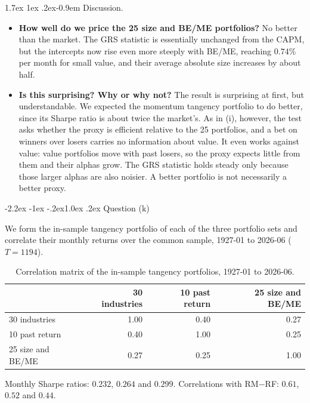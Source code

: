 \documentclass[11pt]{article}
\makeatletter
\renewcommand\subsection{\@startsection{subsection}{2}{0pt}%
  {-2.2ex \@plus -1ex \@minus -.2ex}{1.0ex \@plus .2ex}%
  {\normalfont\bfseries\normalsize\color{psink}}}
\renewcommand\paragraph{\@startsection{paragraph}{4}{0pt}%
  {1.7ex \@plus 1ex \@minus .2ex}{-0.9em}%
  {\normalfont\bfseries\normalsize\color{psink}}}
\makeatother
\begin{document}
\paragraph{Discussion.}
\begin{itemize}
\setlength{\itemsep}{4pt}\setlength{\parskip}{0pt}

\item \textbf{How well do we price the 25 size and BE/ME portfolios?}
No better than the market. The GRS statistic is essentially unchanged from
the CAPM, but the intercepts now rise even more steeply with BE/ME, reaching
$0.74\%$ per month for small value, and their average absolute size
increases by about half.

\item \textbf{Is this surprising? Why or why not?} The result is surprising
at first, but understandable. We expected the momentum tangency portfolio to
do better, since its Sharpe ratio is about twice the market's. As in (i),
however, the test asks whether the proxy is efficient relative
to the 25 portfolios, and a bet on winners over losers carries no
information about value. It even works against value: value portfolios move
with past losers, so the proxy expects little from them and their alphas
grow. The GRS statistic holds steady only because those larger alphas are
also noisier. A better portfolio is not necessarily a better proxy.

\end{itemize}

\subsection{Question (k)}

We form the in-sample tangency portfolio of each of the three portfolio sets
and correlate their monthly returns over the common sample, 1927-01 to
2026-06 ($T = 1194$).

\begin{table}[H]
\centering
\caption{Correlation matrix of the in-sample tangency portfolios, 1927-01 to
2026-06.}
\small
\begin{tabular}{lrrr}
\toprule
& 30 industries & 10 past return & 25 size and BE/ME \\
\midrule
30 industries & 1.00 & 0.40 & 0.27 \\
10 past return & 0.40 & 1.00 & 0.25 \\
25 size and BE/ME & 0.27 & 0.25 & 1.00 \\
\bottomrule
\end{tabular}
\label{tab:p3k}
\vspace{2pt}\begin{minipage}{0.93\textwidth}\footnotesize
Monthly Sharpe ratios: $0.232$, $0.264$ and $0.299$. Correlations with
RM$-$RF: $0.61$, $0.52$ and $0.44$.
\end{minipage}
\end{table}
\end{document}
